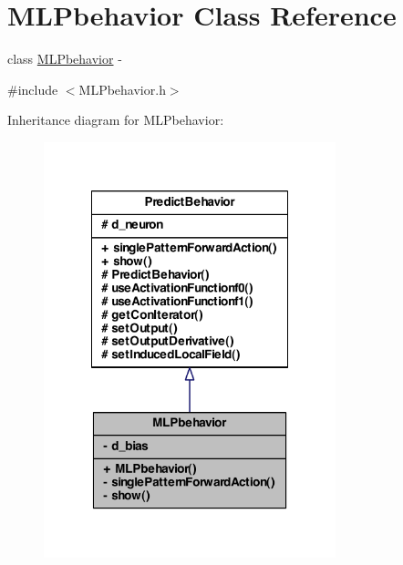 \hypertarget{class_m_l_pbehavior}{
\section{MLPbehavior Class Reference}
\label{class_m_l_pbehavior}
}


class \hyperlink{class_m_l_pbehavior}{MLPbehavior} -\/  




{\ttfamily \#include $<$MLPbehavior.h$>$}



Inheritance diagram for MLPbehavior:\nopagebreak
\begin{figure}[H]
\begin{center}
\leavevmode
\includegraphics[width=240pt]{class_m_l_pbehavior__inherit__graph}
\end{center}
\end{figure}


